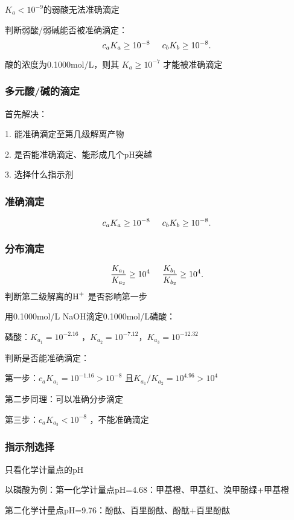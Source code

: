 \begin{notation}
    $K_a<10^{-9}$的弱酸无法准确滴定

    判断弱酸/弱碱能否被准确滴定：
    \[
        c_aK_a\ge 10^{-8}\hspace{0.5cm} c_bK_b\ge 10^{-8}
    .\] 
\end{notation}
\begin{eg}
    酸的浓度为0.1000mol/L，则其 $K_a\ge 10^{-7}$ 才能被准确滴定
\end{eg}
\subsubsection{多元酸/碱的滴定}%
\label{subsub:多元酸/碱的滴定}
\begin{notation}
    首先解决：

    1. 能准确滴定至第几级解离产物

    2. 是否能准确滴定、能形成几个pH突越

    3. 选择什么指示剂
\end{notation}
\subsubsection*{准确滴定}%
\label{subsub:准确滴定}
\[
    c_aK_a\ge 10^{-8} \hspace{0.5cm} c_bK_b\ge 10^{-8}
.\] 
\subsubsection*{分布滴定}%
\label{subsub:分布滴定}
\[
    \frac{K_{a_1}}{K_{a_2}} \ge 10^{4}\hspace{0.5cm} \frac{K_{b_1}}{K_{b_2}} \ge 10^{4}
.\] 
判断第二级解离的$\ce{H+}$ 是否影响第一步
\begin{eg}
    用0.1000mol/L NaOH滴定0.1000mol/L磷酸：

    磷酸：$K_{a_1}=10^{-2.16}$ ，$K_{a_2}=10^{-7.12}$，$K_{a_3}=10^{-12.32}$ 

    判断是否能准确滴定：

    第一步：$c_aK_{a_1}=10^{-1.16}>10^{-8}$ 且$K_{a_1}/K_{a_2}=10^{4.96}>10^{4}$

    第二步同理：可以准确分步滴定

    第三步：$c_aK_{a_3}<10^{-8}$ ，不能准确滴定
\end{eg}
\subsubsection*{指示剂选择}%
\label{subsub:指示剂选择}
只看化学计量点的pH
\begin{eg}
    以磷酸为例：第一化学计量点pH=4.68：甲基橙、甲基红、溴甲酚绿+甲基橙

    第二化学计量点pH=9.76：酚酞、百里酚酞、酚酞+百里酚酞
\end{eg}
